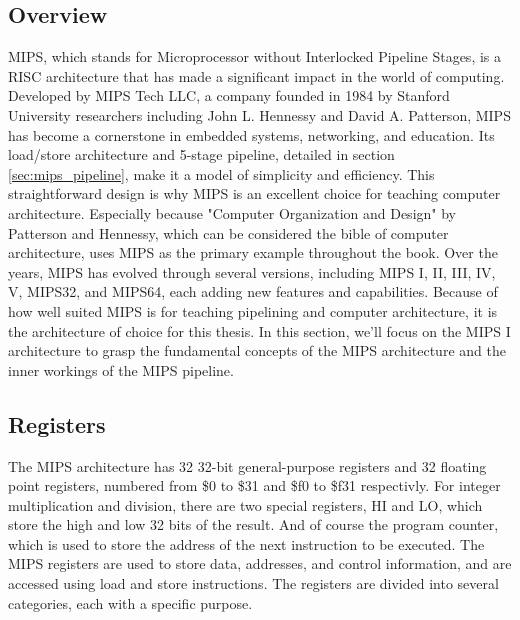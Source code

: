 \subsection{Overview}
MIPS, which stands for Microprocessor without Interlocked Pipeline Stages, is a RISC architecture that has made a significant impact in the world of computing. Developed by MIPS Tech LLC\cite{mipscompany}, a company founded in 1984 by Stanford University researchers including John L. Hennessy and David A. Patterson, MIPS has become a cornerstone in embedded systems, networking, and education. Its load/store architecture and 5-stage pipeline, detailed in section \ref{sec:mips_pipeline}, make it a model of simplicity and efficiency. This straightforward design is why MIPS is an excellent choice for teaching computer architecture. Especially because "Computer Organization and Design" by Patterson and Hennessy\cite{patterson1994computer}, which can be considered the bible of computer architecture, uses MIPS as the primary example throughout the book. Over the years, MIPS has evolved through several versions, including MIPS I, II, III, IV, V, MIPS32, and MIPS64, each adding new features and capabilities. Because of how well suited MIPS is for teaching pipelining and computer architecture, it is the architecture of choice for this thesis. In this section, we'll focus on the MIPS I architecture to grasp the fundamental concepts of the MIPS architecture and the inner workings of the MIPS pipeline.

\subsection{Registers}
The MIPS architecture has 32 32-bit general-purpose registers and 32 floating point registers, numbered from \$0 to \$31 and \$f0 to \$f31 respectivly. For integer multiplication and division, there are two special registers, HI and LO, which store the high and low 32 bits of the result. And of course the program counter, which is used to store the address of the next instruction to be executed. The MIPS registers are used to store data, addresses, and control information, and are accessed using load and store instructions. The registers are divided into several categories, each with a specific purpose\cite{sweetman2010see}\cite{patterson1994computer}.
